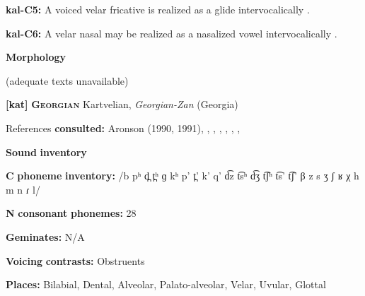 \documentclass[output=paper]{langsci/langscibook}
\begin{document}
\begin{styleBody}
\textbf{kal-C5:} A voiced velar fricative is realized as a glide intervocalically \citep[334]{Fortescue1984}.
\end{styleBody}

\begin{styleBody}
\textbf{kal-C6:} A velar nasal may be realized as a nasalized vowel intervocalically \citep[334]{Fortescue1984}.
\end{styleBody}

\begin{styleBody}
\textbf{Morphology}
\end{styleBody}

\begin{styleBody}
(adequate texts unavailable)
\end{styleBody}

\begin{styleBody}
\textbf{[kat]}   \textbf{\textsc{Georgian}}    Kartvelian, \textit{Georgian-Zan} (Georgia)
\end{styleBody}

\begin{styleBody}
References \textbf{consulted:} Aronson (1990, 1991), \citet{Chitoran1998}, \citet{Hewitt1995}, \citet{JunEtAl2006}, \citet{ShostedChikovani2006}, \citet{SkopeteasFéry2010}, \citet{Vicenek2010}, \citet{Vogt1958}
\end{styleBody}

\begin{styleBody}
\textbf{Sound} \textbf{inventory}
\end{styleBody}

\begin{styleBody}
\textbf{C} \textbf{phoneme} \textbf{inventory:} /b pʰ d̪ t̪ʰ ɡ kʰ p’ t̪’ k’ q’ d͡z t͡sʰ d͡ʒ t͡ʃʰ t͡s’ t͡ʃ’ β z s ʒ ʃ ʁ χ h m n ɾ l/
\end{styleBody}

\begin{styleBody}
\textbf{N} \textbf{consonant} \textbf{phonemes:} 28
\end{styleBody}

\begin{styleBody}
\textbf{Geminates:} N/A
\end{styleBody}

\begin{styleBody}
\textbf{Voicing} \textbf{contrasts:} Obstruents
\end{styleBody}

\begin{styleBody}
\textbf{Places:} Bilabial, Dental, Alveolar, Palato-alveolar, Velar, Uvular, Glottal
\end{styleBody}
\end{document}
